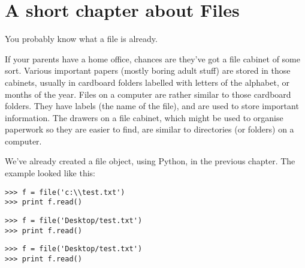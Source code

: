

\chapter{A short chapter about Files}\label{ch:ashortchapteraboutfiles}

You probably know what a file is already.
\par
\noindent
If your parents have a home office, chances are they've got a file cabinet of some sort.  Various important papers (mostly boring adult stuff) are stored in those cabinets, usually in cardboard folders labelled with letters of the alphabet, or months of the year. Files on a computer are rather similar to those cardboard folders. They have labels (the name of the file), and are used to store important information. The drawers on a file cabinet, which might be used to organise paperwork so they are easier to find, are similar to directories (or folders) on a computer.
\par
We've already created a file object, using Python, in the previous chapter.  The example looked like this:

\begin{WINDOWS}

\begin{listing}
\begin{verbatim}
>>> f = file('c:\\test.txt')
>>> print f.read()
\end{verbatim}
\end{listing}

\end{WINDOWS}

\begin{MAC}

\begin{listing}
\begin{verbatim}
>>> f = file('Desktop/test.txt')
>>> print f.read()
\end{verbatim}
\end{listing}

\end{MAC}

\begin{LINUX}

\begin{listing}
\begin{verbatim}
>>> f = file('Desktop/test.txt')
>>> print f.read()
\end{verbatim}
\end{listing}
 
\end{LINUX}

